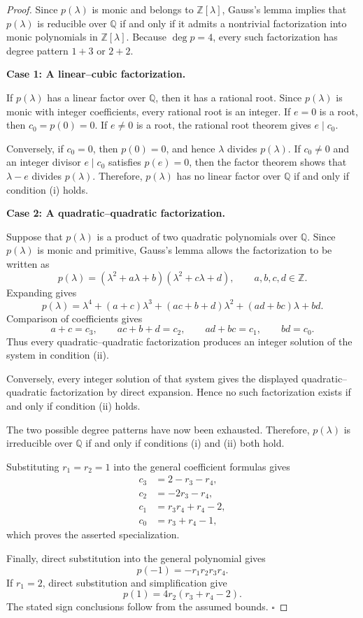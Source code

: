 \documentclass[11pt]{amsart}
\begin{document}
\begin{proof}
Since \(p(\lambda)\) is monic and belongs to \(\mathbb Z[\lambda]\), Gauss's lemma implies that \(p(\lambda)\) is reducible over \(\mathbb Q\) if and only if it admits a nontrivial factorization into monic polynomials in \(\mathbb Z[\lambda]\). Because \(\deg p=4\), every such factorization has degree pattern \(1+3\) or \(2+2\).

\medskip
\noindent\textbf{Case 1: A linear--cubic factorization.}

If \(p(\lambda)\) has a linear factor over \(\mathbb Q\), then it has a rational root. Since \(p(\lambda)\) is monic with integer coefficients, every rational root is an integer. If \(e=0\) is a root, then \(c_0=p(0)=0\). If \(e\neq 0\) is a root, the rational root theorem gives \(e\mid c_0\).

Conversely, if \(c_0=0\), then \(p(0)=0\), and hence \(\lambda\) divides \(p(\lambda)\). If \(c_0\neq 0\) and an integer divisor \(e\mid c_0\) satisfies \(p(e)=0\), then the factor theorem shows that \(\lambda-e\) divides \(p(\lambda)\). Therefore, \(p(\lambda)\) has no linear factor over \(\mathbb Q\) if and only if condition \textup{(i)} holds.

\medskip
\noindent\textbf{Case 2: A quadratic--quadratic factorization.}

Suppose that \(p(\lambda)\) is a product of two quadratic polynomials over \(\mathbb Q\). Since \(p(\lambda)\) is monic and primitive, Gauss's lemma allows the factorization to be written as
\[
p(\lambda)
=
(\lambda^2+a\lambda+b)(\lambda^2+c\lambda+d),
\qquad a,b,c,d\in\mathbb Z.
\]
Expanding gives
\[
p(\lambda)
=
\lambda^4+(a+c)\lambda^3+(ac+b+d)\lambda^2+(ad+bc)\lambda+bd.
\]
Comparison of coefficients gives
\[
a+c=c_3,\qquad
ac+b+d=c_2,\qquad
ad+bc=c_1,\qquad
bd=c_0.
\]
Thus every quadratic--quadratic factorization produces an integer solution of the system in condition \textup{(ii)}.

Conversely, every integer solution of that system gives the displayed quadratic--quadratic factorization by direct expansion. Hence no such factorization exists if and only if condition \textup{(ii)} holds.

The two possible degree patterns have now been exhausted. Therefore, \(p(\lambda)\) is irreducible over \(\mathbb Q\) if and only if conditions \textup{(i)} and \textup{(ii)} both hold.

Substituting \(r_1=r_2=1\) into the general coefficient formulas gives
\[
\begin{aligned}
c_3&=2-r_3-r_4,\\
c_2&=-2r_3-r_4,\\
c_1&=r_3r_4+r_4-2,\\
c_0&=r_3+r_4-1,
\end{aligned}
\]
which proves the asserted specialization.

Finally, direct substitution into the general polynomial gives
\[
p(-1)=-r_1r_2r_3r_4.
\]
If \(r_1=2\), direct substitution and simplification give
\[
p(1)=4r_2(r_3+r_4-2).
\]
The stated sign conclusions follow from the assumed bounds. \hfill $\square$
\end{proof}
\end{document}
